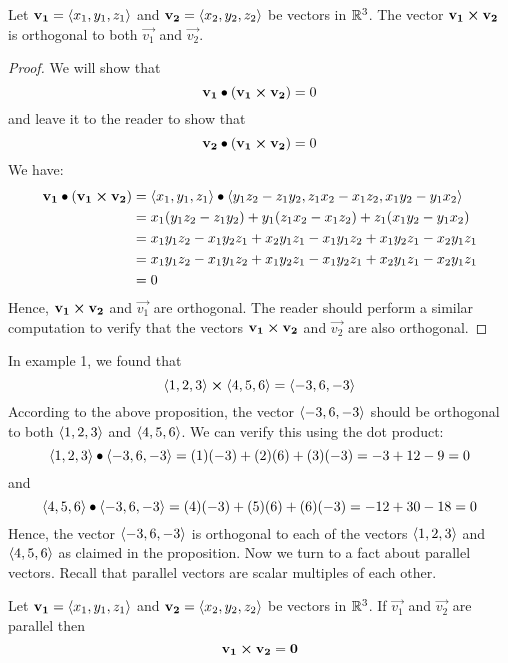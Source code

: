 \documentclass[handout]{ximera}
\begin{document}
\begin{proposition}[Orthogonality] 
Let  $\mathbf{v_1} = \left\langle x_1, y_1, z_1\right\rangle$ and $\mathbf{v_2} = \left\langle x_2, y_2, z_2\right\rangle$ be vectors in $\mathbb R^3$. 
The vector $\mathbf{v_1}\boldsymbol\times \mathbf{v_2}$ is orthogonal to both $\vec{v_1}$ and $\vec{v_2}$. 
\end{proposition}
\begin{proof} We will show that 
\[
 \mathbf{v_1} \bullet \left(\mathbf{v_1} \boldsymbol\times \mathbf{v_2} \right) = 0
\]
and leave it to the reader to show that
\[
\mathbf{v_2} \bullet \left(\mathbf{v_1} \boldsymbol\times \mathbf{v_2} \right) = 0
\]
We have:
\begin{align*}
\mathbf{v_1} \bullet \left(\mathbf{v_1} \boldsymbol\times \mathbf{v_2} \right)  
                            &= \left\langle x_1, y_1, z_1\right\rangle\bullet \left\langle y_1z_2 - z_1y_2, z_1x_2 - x_1z_2, x_1y_2 - y_1x_2\right\rangle \\
                                                &= x_1(y_1z_2 - z_1y_2) + y_1(z_1x_2 - x_1z_2) + z_1(x_1y_2 - y_1x_2)\\
                                                &= x_1y_1z_2 - x_1y_2z_1 + x_2y_1z_1 - x_1y_1z_2 + x_1y_2z_1 - x_2y_1z_1\\
                                                &= x_1y_1z_2 - x_1y_1z_2 + x_1y_2z_1 - x_1y_2z_1 + x_2y_1z_1 - x_2y_1z_1\\
                                                &= 0
\end{align*}
Hence, $\mathbf{v_1} \boldsymbol\times \mathbf{v_2}$ and $\vec{v_1}$ are orthogonal.  
The reader should perform a similar computation to verify that the vectors
$\mathbf{v_1} \boldsymbol\times \mathbf{v_2}$ and $\vec{v_2}$ are also orthogonal.
\end{proof}
In example 1, we found that
\[
\left\langle 1, 2, 3\right\rangle \boldsymbol\times \left\langle 4, 5, 6\right\rangle = \left\langle -3, 6, -3\right\rangle
\]
According to the above proposition, the vector $\left\langle -3, 6, -3\right\rangle$ should be orthogonal to both $\left\langle 1, 2, 3\right\rangle$ and $\left\langle 4, 5, 6\right\rangle$.
We can verify this using the dot product:
\[
\left\langle 1, 2, 3\right\rangle \bullet \left\langle -3, 6, -3\right\rangle = (1)(-3) +(2)(6)+(3)(-3) = -3+12-9 = 0
\]
and
\[
\left\langle 4, 5, 6\right\rangle \bullet \left\langle -3, 6, -3\right\rangle = (4)(-3) +(5)(6)+(6)(-3) = -12 + 30 -18 = 0
\]
Hence, the vector $\left\langle -3, 6, -3\right\rangle$ is orthogonal to each of the vectors $\left\langle 1, 2, 3\right\rangle$ and $\left\langle 4, 5, 6\right\rangle$ as claimed in the proposition.
Now we turn to a fact about parallel vectors.
Recall that parallel vectors are scalar multiples of each other.
\begin{proposition}
Let  $\mathbf{v_1} = \left\langle x_1, y_1, z_1\right\rangle$ and $\mathbf{v_2} = \left\langle x_2, y_2, z_2\right\rangle$ be vectors in $\mathbb R^3$.
If $\vec{v_1}$ and $\vec{v_2}$ are parallel then 
\[
\mathbf{v_1} \boldsymbol\times \mathbf{v_2} = \mathbf 0
\]
\end{proposition}
\end{document}
